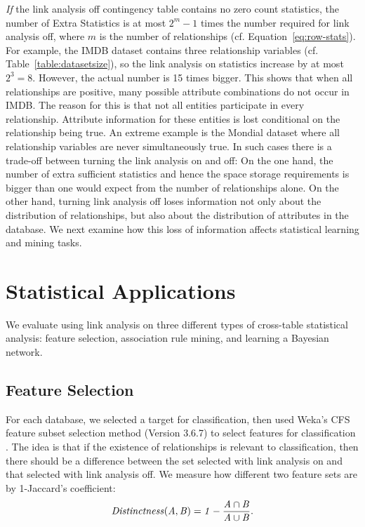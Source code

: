 \documentclass{acm_proc_article-sp}
\begin{document}
{\em If} the link analysis off contingency table contains no zero count statistics, the number of Extra Statistics is at most $2^{m}-1$ times the number required for link analysis off, where $m$ is the number of relationships (cf. Equation~\eqref{eq:row-stats}). For example, the IMDB dataset contains three relationship variables (cf. Table~\ref{table:datasetsize}), so the link analysis on statistics increase by at most $2^{3} = 8$. However, the actual number is 15 times bigger. This shows that when all relationships are positive, many possible attribute combinations do not occur in IMDB. The reason for this is that not all entities participate in every relationship. Attribute information for these entities is lost conditional on the relationship being true. 
An extreme example is the Mondial dataset where all relationship variables are never simultaneously true.
In such cases there is a trade-off between turning the link analysis on and off: On the one hand, the number of extra sufficient statistics and hence the space storage requirements is bigger than one would expect from the number of relationships alone. On the other hand, turning link analysis off loses information not only about the distribution of relationships, but also about the distribution of attributes in the database. We next examine how this loss of information affects statistical learning and mining tasks.

\section{Statistical Applications} We evaluate using link analysis on three different types of cross-table statistical analysis: feature selection, association rule  mining, and learning a Bayesian network.

\subsection{Feature Selection} For each database, we selected a target for classification, then used Weka's CFS feature subset selection method (Version 3.6.7) to select features for classification \cite{Hall2009}. The idea is that if the existence of relationships is relevant to classification, then there should be a difference between the set selected with link analysis on and that selected with link analysis off. 
We measure how different two feature sets are by 1-Jaccard's coefficient:
$$\it{Distinctness}(A,B) = 1- \frac{A \cap B}{A \cup B}.$$
\end{document}
